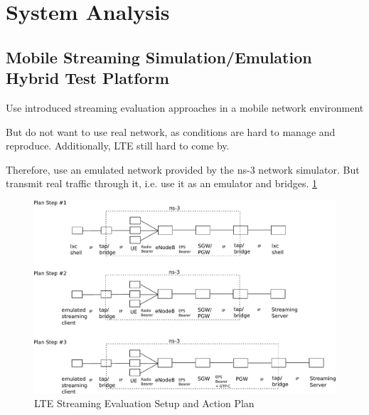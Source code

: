 \section{System Analysis}
\subsection{Mobile Streaming Simulation/Emulation Hybrid Test Platform}

Use introduced streaming evaluation approaches in a mobile network environment

But do not want to use real network, as conditions are hard to manage and reproduce. Additionally, LTE still hard to come by.

Therefore, use an emulated network provided by the ns-3 network simulator. But transmit real traffic through it, i.e. use it as an emulator and bridges. \ref{fig:lte-testbed}

\begin{figure}
\centering
\includegraphics[width=\textwidth]{images/lte-testbed.pdf}
\caption{LTE Streaming Evaluation Setup and Action Plan}
\label{fig:lte-testbed}
\end{figure}